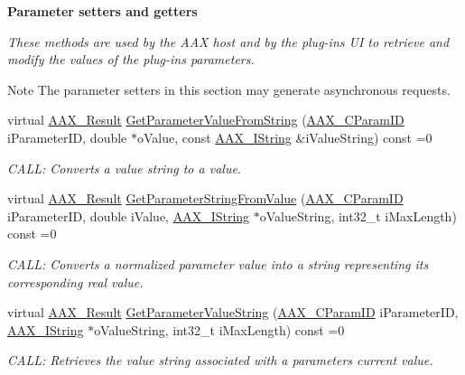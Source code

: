 \begin{Indent}\textbf{ Parameter setters and getters}\par
{\em These methods are used by the A\+AX host and by the plug-\/in\textquotesingle{}s UI to retrieve and modify the values of the plug-\/in\textquotesingle{}s parameters.

\begin{DoxyNote}{Note}
The parameter setters in this section may generate asynchronous requests. 
\end{DoxyNote}
}\begin{DoxyCompactItemize}
\item 
virtual \mbox{\hyperlink{a00392_a4d8f69a697df7f70c3a8e9b8ee130d2f}{A\+A\+X\+\_\+\+Result}} \mbox{\hyperlink{a01669_a54bb12c9798e4f9a3a5b5d6f30ace992}{Get\+Parameter\+Value\+From\+String}} (\mbox{\hyperlink{a00392_a1440c756fe5cb158b78193b2fc1780d1}{A\+A\+X\+\_\+\+C\+Param\+ID}} i\+Parameter\+ID, double $\ast$o\+Value, const \mbox{\hyperlink{a01873}{A\+A\+X\+\_\+\+I\+String}} \&i\+Value\+String) const =0
\begin{DoxyCompactList}\small\item\em C\+A\+LL\+: Converts a value string to a value. \end{DoxyCompactList}\item 
virtual \mbox{\hyperlink{a00392_a4d8f69a697df7f70c3a8e9b8ee130d2f}{A\+A\+X\+\_\+\+Result}} \mbox{\hyperlink{a01669_add995f2eb5a3967c48dd9f3e21f003aa}{Get\+Parameter\+String\+From\+Value}} (\mbox{\hyperlink{a00392_a1440c756fe5cb158b78193b2fc1780d1}{A\+A\+X\+\_\+\+C\+Param\+ID}} i\+Parameter\+ID, double i\+Value, \mbox{\hyperlink{a01873}{A\+A\+X\+\_\+\+I\+String}} $\ast$o\+Value\+String, int32\+\_\+t i\+Max\+Length) const =0
\begin{DoxyCompactList}\small\item\em C\+A\+LL\+: Converts a normalized parameter value into a string representing its corresponding real value. \end{DoxyCompactList}\item 
virtual \mbox{\hyperlink{a00392_a4d8f69a697df7f70c3a8e9b8ee130d2f}{A\+A\+X\+\_\+\+Result}} \mbox{\hyperlink{a01669_aacb54e6522561fe91fe12d0d99734abf}{Get\+Parameter\+Value\+String}} (\mbox{\hyperlink{a00392_a1440c756fe5cb158b78193b2fc1780d1}{A\+A\+X\+\_\+\+C\+Param\+ID}} i\+Parameter\+ID, \mbox{\hyperlink{a01873}{A\+A\+X\+\_\+\+I\+String}} $\ast$o\+Value\+String, int32\+\_\+t i\+Max\+Length) const =0
\begin{DoxyCompactList}\small\item\em C\+A\+LL\+: Retrieves the value string associated with a parameter\textquotesingle{}s current value. \end{DoxyCompactList}\item 

\end{DoxyCompactItemize}
\end{Indent}
